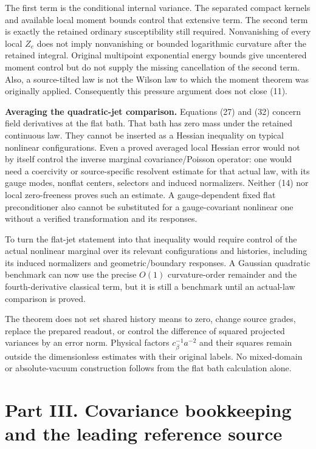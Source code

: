 \documentclass[
  11pt,
]{article}
\begin{document}
The first term is the conditional internal variance. The separated
compact kernels and available local moment bounds control that extensive
term. The second term is exactly the retained ordinary susceptibility
still required. Nonvanishing of every local \(Z_e\) does not imply
nonvanishing or bounded logarithmic curvature after the retained
integral. Original multipoint exponential energy bounds give uncentered
moment control but do not supply the missing cancellation of the second
term. Also, a source-tilted law is not the Wilson law to which the
moment theorem was originally applied. Consequently this
pressure argument does not close (11).

\textbf{Averaging the quadratic-jet comparison.} Equations (27) and (32)
concern field derivatives at the flat bath. That bath has zero mass
under the retained continuous law. They cannot be inserted as a Hessian
inequality on typical nonlinear configurations. Even a proved averaged
local Hessian error would not by itself control the inverse marginal
covariance/Poisson operator: one would need a coercivity or
source-specific resolvent estimate for that actual law, with its gauge
modes, nonflat centers, selectors and induced normalizers. Neither (14)
nor local zero-freeness proves such an estimate. A gauge-dependent fixed
flat preconditioner also cannot be substituted for a gauge-covariant
nonlinear one without a verified transformation and its responses.

To turn the flat-jet statement into that inequality would require
control of the actual nonlinear marginal over its relevant
configurations and histories, including its induced normalizers and
geometric/boundary responses. A Gaussian quadratic benchmark can now use
the precise \(O(1)\) curvature-order remainder and the fourth-derivative
classical term, but it is still a benchmark until an actual-law
comparison is proved.

The theorem does not set shared history means to zero, change source
grades, replace the prepared readout, or control the difference of
squared projected variances by an error norm. Physical factors
\(c_\beta^{-1}a^{-2}\) and their squares remain outside the
dimensionless estimates with their original labels. No mixed-domain or
absolute-vacuum construction follows from the flat bath calculation
alone.

\newpage

\hypertarget{part-iii.-covariance-bookkeeping-and-the-leading-reference-source}{%
\section{Part III. Covariance bookkeeping and the leading reference
source}\label{part-iii.-covariance-bookkeeping-and-the-leading-reference-source}}
\end{document}
